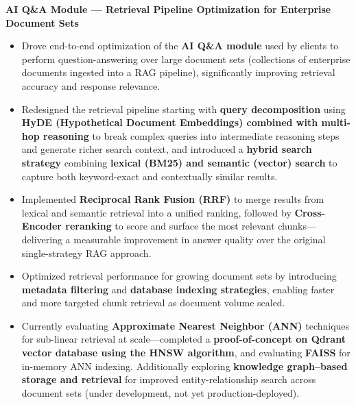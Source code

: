 \documentclass[a4paper,11pt]{article}
\begin{document}
\vspace{4pt}
\textbf{AI Q\&A Module --- Retrieval Pipeline Optimization for Enterprise Document Sets}
\begin{itemize}[leftmargin=*, nosep]
  \item Drove end-to-end optimization of the \textbf{AI Q\&A module} used by clients to perform question-answering over large document sets (collections of enterprise documents ingested into a RAG pipeline), significantly improving retrieval accuracy and response relevance.
  \item Redesigned the retrieval pipeline starting with \textbf{query decomposition} using \textbf{HyDE (Hypothetical Document Embeddings) combined with multi-hop reasoning} to break complex queries into intermediate reasoning steps and generate richer search context, and introduced a \textbf{hybrid search strategy} combining \textbf{lexical (BM25) and semantic (vector) search} to capture both keyword-exact and contextually similar results.
  \item Implemented \textbf{Reciprocal Rank Fusion (RRF)} to merge results from lexical and semantic retrieval into a unified ranking, followed by \textbf{Cross-Encoder reranking} to score and surface the most relevant chunks---delivering a measurable improvement in answer quality over the original single-strategy RAG approach.
  \item Optimized retrieval performance for growing document sets by introducing \textbf{metadata filtering} and \textbf{database indexing strategies}, enabling faster and more targeted chunk retrieval as document volume scaled.
  \item Currently evaluating \textbf{Approximate Nearest Neighbor (ANN)} techniques for sub-linear retrieval at scale---completed a \textbf{proof-of-concept on Qdrant vector database using the HNSW algorithm}, and evaluating \textbf{FAISS} for in-memory ANN indexing. Additionally exploring \textbf{knowledge graph--based storage and retrieval} for improved entity-relationship search across document sets (under development, not yet production-deployed).
\end{itemize}
\end{document}
